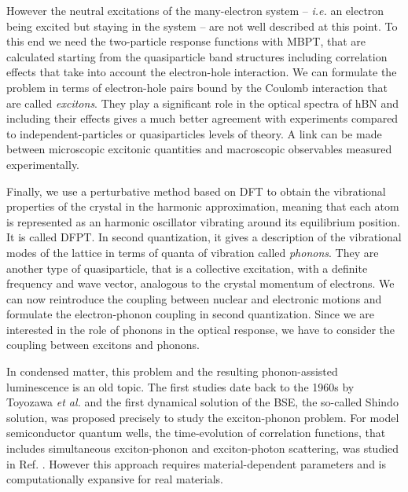 However the neutral excitations of the many-electron system -- \textit{i.e.} an electron being excited but staying in the system -- are not well described at this point. To this end we need the two-particle response functions with \acrshort{MBPT}, that are calculated starting from the quasiparticle band structures including correlation effects that take into account the electron-hole interaction. We can formulate the problem in terms of electron-hole pairs bound by the Coulomb interaction that are called \textit{excitons}. They play a significant role in the optical spectra of \acrshort{hBN} and including their effects gives a much better agreement with experiments compared to independent-particles or quasiparticles levels of theory.
A link can be made between microscopic excitonic quantities and macroscopic observables measured experimentally.\cite{martin2016interacting} 

Finally, we use a perturbative method based on \acrshort{DFT} to obtain the vibrational properties of the crystal in the harmonic approximation, meaning that each atom is represented as an harmonic oscillator vibrating around its equilibrium position. It is called \acrfull{DFPT}.\cite{baroni2001phonons} In second quantization, it gives a description of the vibrational modes of the lattice in terms of quanta of vibration called \textit{phonons}. They are another type of quasiparticle, that is a collective excitation, with a definite frequency and wave vector, analogous to the crystal momentum of electrons. We can now reintroduce the coupling between nuclear and electronic motions and formulate the electron-phonon coupling in second quantization. Since we are interested in the role of phonons in the optical response, we have to consider the coupling between excitons and phonons.

In condensed matter, this problem and the resulting phonon-assisted luminescence is an old topic. The first studies date back to the 1960s by Toyozawa \emph{et al.}\cite{toyozawa2003optical,toyozawa1964interband} and the first dynamical solution of the \acrshort{BSE}, the so-called Shindo solution, was proposed precisely to study the exciton-phonon problem.\cite{shindo1970effective}
For model semiconductor quantum wells, the time-evolution of correlation functions, that includes simultaneous exciton-phonon and exciton-photon scattering, was studied in Ref. \cite{thranhardt2000quantum}. However this approach requires material-dependent parameters and is computationally expansive for real materials.

